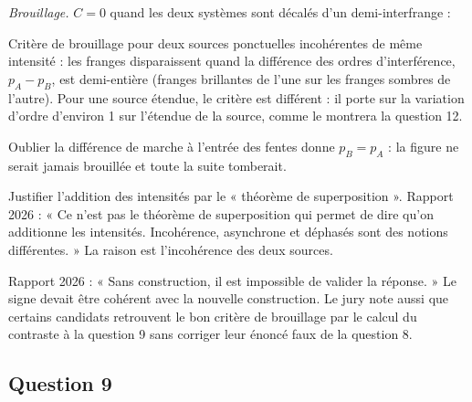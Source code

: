 \documentclass[11pt,a4paper]{article}
\newcommand{\equationajustee}[1]{%
  \sbox{\boiteequation}{$\displaystyle #1$}%
  \ifdim\wd\boiteequation>\linewidth
    \[\resizebox{\linewidth}{!}{\usebox{\boiteequation}}\]%
  \else
    \[#1\]%
  \fi}
\begin{document}
\emph{Brouillage.} \(C=0\) quand les deux systèmes sont décalés d'un demi-interfrange :

\equationajustee{\begin{aligned}
\frac{\pi b(\theta)\epsilon}{2\lambda_0}&=\frac\pi2+k\pi\\
\boxed{b(\theta)=(2k+1)\frac{\lambda_0}{\epsilon},\ k\in\mathbb N}&
\end{aligned}}

\begin{methode}

Critère de brouillage pour deux sources ponctuelles incohérentes de même intensité : les franges disparaissent quand la différence des ordres d'interférence, \(p_A-p_B\), est demi-entière (franges brillantes de l'une sur les franges sombres de l'autre). Pour une source étendue, le critère est différent : il porte sur la variation d'ordre d'environ 1 sur l'étendue de la source, comme le montrera la question 12.

\end{methode}

\begin{piege}

Oublier la différence de marche à l'entrée des fentes donne \(p_B=p_A\) : la figure ne serait jamais brouillée et toute la suite tomberait.

\end{piege}

\begin{piege}

Justifier l'addition des intensités par le « théorème de superposition ». Rapport 2026 : « Ce n'est pas le théorème de superposition qui permet de dire qu'on additionne les intensités. Incohérence, asynchrone et déphasés sont des notions différentes. » La raison est l'incohérence des deux sources.

\end{piege}

\begin{jury}

Rapport 2026 : « Sans construction, il est impossible de valider la réponse. » Le signe devait être cohérent avec la nouvelle construction. Le jury note aussi que certains candidats retrouvent le bon critère de brouillage par le calcul du contraste à la question 9 sans corriger leur énoncé faux de la question 8.

\end{jury}

\hypertarget{question-9}{%
\subsection{Question 9}\label{question-9}}
\end{document}
